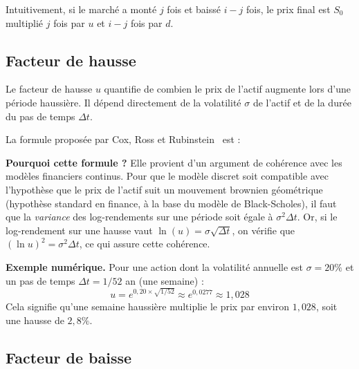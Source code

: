 \documentclass[11pt]{report}
\begin{document}
\medskip

Intuitivement, si le marché a monté $j$ fois et baissé $i-j$ fois, le prix
final est $S_0$ multiplié $j$ fois par $u$ et $i-j$ fois par $d$.

\subsection{Facteur de hausse}

Le facteur de hausse $u$ quantifie de combien le prix de l'actif augmente
lors d'une période haussière. Il dépend directement de la volatilité $\sigma$
de l'actif et de la durée du pas de temps $\Delta t$.

La formule proposée par Cox, Ross et Rubinstein~\cite{crr1979} est :

\medskip

\noindent{}

\medskip

\textbf{Pourquoi cette formule ?} Elle provient d'un argument de cohérence
avec les modèles financiers continus. Pour que le modèle discret soit
compatible avec l'hypothèse que le prix de l'actif suit un mouvement brownien
géométrique (hypothèse standard en finance, à la base du modèle de
Black-Scholes), il faut que la \textit{variance} des log-rendements sur une
période soit égale à $\sigma^2 \Delta t$. Or, si le log-rendement sur une
hausse vaut $\ln(u) = \sigma\sqrt{\Delta t}$, on vérifie que
$(\ln u)^2 = \sigma^2 \Delta t$, ce qui assure cette cohérence.

\textbf{Exemple numérique.} Pour une action dont la volatilité annuelle est
$\sigma = 20\%$ et un pas de temps $\Delta t = 1/52$ an (une semaine) :
\[
    u = e^{0{,}20 \times \sqrt{1/52}} \approx e^{0{,}0277} \approx 1{,}028
\]
Cela signifie qu'une semaine haussière multiplie le prix par environ $1{,}028$,
soit une hausse de $2{,}8\%$.

\subsection{Facteur de baisse}
\end{document}
